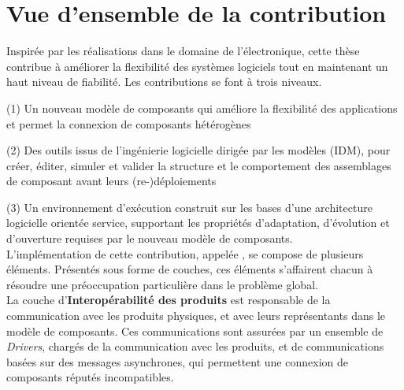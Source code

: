 \section{Vue d'ensemble de la contribution}

Inspirée par les réalisations dans le domaine de l'électronique, cette thèse contribue à améliorer la flexibilité des systèmes logiciels tout en maintenant un haut niveau de fiabilité. Les contributions se font à trois niveaux.

\par (1) Un nouveau modèle de composants qui améliore la flexibilité des applications et permet la connexion de composants hétérogènes
\par (2) Des outils issus de l'ingénierie logicielle dirigée par les modèles (IDM), pour créer, éditer, simuler et valider la structure et le comportement des assemblages de composant avant leurs (re-)déploiements
\par (3) Un environnement d'exécution construit sur les bases d'une architecture logicielle orientée service, supportant les propriétés d'adaptation, d'évolution et d'ouverture requises par le nouveau modèle de composants.\\

L'implémentation de cette contribution, appelée \enti{}, se compose de plusieurs éléments. Présentés sous forme de couches, ces éléments s'affairent chacun à résoudre une préoccupation particulière dans le problème global.\\

La couche d'{\bf Interopérabilité des produits} est responsable de la communication avec les produits physiques, et avec leurs représentants dans le modèle de composants. Ces communications sont assurées par un ensemble de {\it Drivers}, chargés de la communication avec les produits, et de communications basées sur des messages asynchrones, qui permettent une connexion de composants réputés incompatibles.\\

